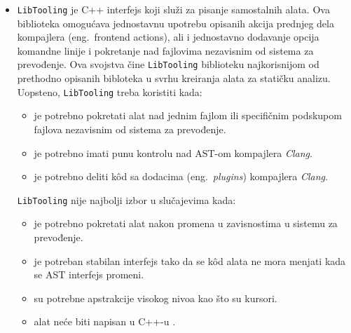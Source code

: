 \documentclass[12pt,oneside]{memoir}
\begin{document}
\begin{itemize}
\item \texttt{LibTooling} je C++ interfejs koji slu\v{z}i za pisanje samostalnih alata. Ova biblioteka omogu\'{c}ava jednostavnu
upotrebu opisanih akcija prednjeg dela kompajlera (eng.~frontend actions), ali i jednostavno dodavanje opcija komandne linije i pokretanje nad fajlovima 
nezavisnim od sistema za prevođenje. Ova svojstva \v{c}ine \texttt{LibTooling} biblioteku najkorisnijom od prethodno opisanih bibloteka u svrhu kreiranja alata za stati\v{c}ku analizu.
Uopsteno, \texttt{LibTooling} treba koristiti kada:
\begin{itemize}
  \item je potrebno pokretati alat nad jednim fajlom ili specifi\v{c}nim podskupom fajlova nezavisnim od sistema za prevođenje.
  \item je potrebno imati punu kontrolu nad AST-om kompajlera \textit{Clang}.
  \item je potrebno deliti k\^{o}d sa dodacima (eng.~\textit{plugins}) kompajlera \textit{Clang}.
\end{itemize}
\texttt{LibTooling} nije najbolji izbor u slu\v{c}ajevima kada:
\begin{itemize}
  \item je potrebno pokretati alat nakon promena u zavisnostima u sistemu za prevođenje.
  \item je potreban stabilan interfejs tako da se k\^{o}d alata ne mora menjati kada se AST interfejs promeni.
  \item su potrebne apstrakcije visokog nivoa kao \v{s}to su kursori.
  \item alat ne\'{c}e biti napisan u C++-u \cite{RightInterface}.
\end{itemize}
\end{itemize}
\end{document}
